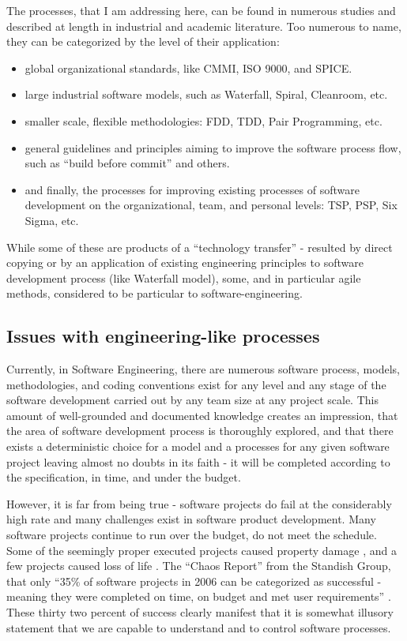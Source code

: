 The processes, that I am addressing here, can be found in numerous studies and described at length 
in industrial and academic literature. Too numerous to name, they can be categorized by the level 
of their application:
\begin{itemize}
 \item global organizational standards, like CMMI, ISO 9000, and SPICE. 
 \item large industrial software models, such as Waterfall, Spiral, Cleanroom, etc.
 \item smaller scale, flexible methodologies: FDD, TDD, Pair Programming, etc.
 \item general guidelines and principles aiming to improve the software process flow, 
such as ``build before commit'' and others.
 \item and finally, the processes for improving existing processes of software development 
on the organizational, team, and personal levels: TSP, PSP, Six Sigma, etc.
\end{itemize}
While some of these are products of a ``technology transfer'' - resulted by direct copying or by an 
application of existing engineering principles to software development process (like Waterfall model), 
some, and in particular agile methods, considered to be particular to software-engineering. 

\subsection{Issues with engineering-like processes}
Currently, in Software Engineering, there are numerous software process, models, methodologies, 
and coding conventions exist for any level and any stage of the software development carried out by 
any team size at any project scale. 
This amount of well-grounded and documented knowledge creates an impression, that the area of 
software development process is thoroughly explored, and that there exists a deterministic choice 
for a model and a processes for any given software project leaving almost no doubts in 
its faith - it will be completed according to the specification, in time, and under the budget.

However, it is far from being true - software projects do fail at the considerably high rate and 
many challenges exist in software product development. Many software projects continue to run over 
the budget, do not meet the schedule. Some of the seemingly proper executed projects caused property 
damage \cite{citeulike:11044022}, and a few projects caused loss of life \cite{citeulike:712058}. 
The ``Chaos Report'' from the Standish Group, that only ``35\% of software projects in 2006 can be 
categorized as successful - meaning they were completed on time, on budget and met 
user requirements'' \cite{chaos2006}. These thirty two percent of success clearly manifest that 
it is somewhat illusory statement that we are capable to understand and to control software processes.

